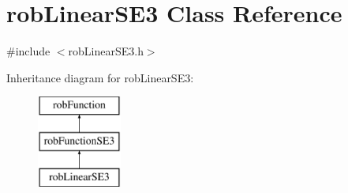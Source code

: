 \hypertarget{classrob_linear_s_e3}{\section{rob\-Linear\-S\-E3 Class Reference}
\label{classrob_linear_s_e3}
}


{\ttfamily \#include $<$rob\-Linear\-S\-E3.\-h$>$}

Inheritance diagram for rob\-Linear\-S\-E3\-:\begin{figure}[H]
\begin{center}
\leavevmode
\includegraphics[height=3.000000cm]{d5/d09/classrob_linear_s_e3}
\end{center}
\end{figure}
